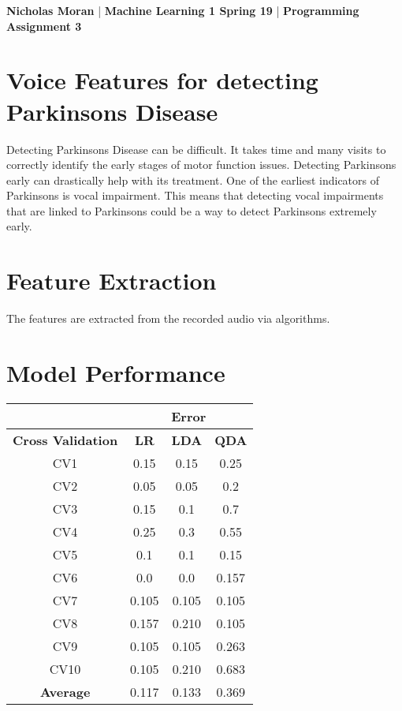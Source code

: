 \setlength{\parindent}{10ex}

\textbf{Nicholas Moran} |
\textbf{Machine Learning 1 Spring 19} |
\textbf{Programming Assignment 3} 

\section{Voice Features for detecting Parkinsons Disease}
    Detecting Parkinsons Disease can be difficult. 
    It takes time and many visits to correctly identify the early stages of motor function issues.
    Detecting Parkinsons early can drastically help with its treatment.
    One of the earliest indicators of Parkinsons is vocal impairment.
    This means that detecting vocal impairments that are linked to Parkinsons could be a way to detect Parkinsons extremely early.


\section{Feature Extraction}
    The features are extracted from the recorded audio via algorithms.




\section{Model Performance}

\begin{center}
    \begin{tabular}{|c|c|c|c|}
        \hline
            \multicolumn{1}{|r|}{} & \multicolumn{3}{|c|}{Error} \\
        \hline
        \textbf{Cross Validation} & \textbf{LR} & \textbf{LDA} & \textbf{QDA} \\
        \hline
        CV1 & 0.15 & 0.15 & 0.25 \\
        \hline
        CV2 & 0.05 & 0.05 & 0.2 \\
        \hline
        CV3 & 0.15 & 0.1 & 0.7 \\
        \hline 
        CV4 & 0.25 & 0.3 & 0.55 \\
        \hline 
        CV5 & 0.1 & 0.1 & 0.15 \\
        \hline
        CV6 & 0.0 & 0.0 & 0.157 \\
        \hline 
        CV7 & 0.105 & 0.105 & 0.105 \\
        \hline 
        CV8 & 0.157 & 0.210 & 0.105 \\
        \hline
        CV9 & 0.105 & 0.105 & 0.263 \\
        \hline
        CV10 & 0.105 & 0.210 & 0.683 \\
        \hline
        \textbf{Average} & 0.117 & 0.133 & 0.369 \\
        \hline
    \end{tabular}
\end{center}

